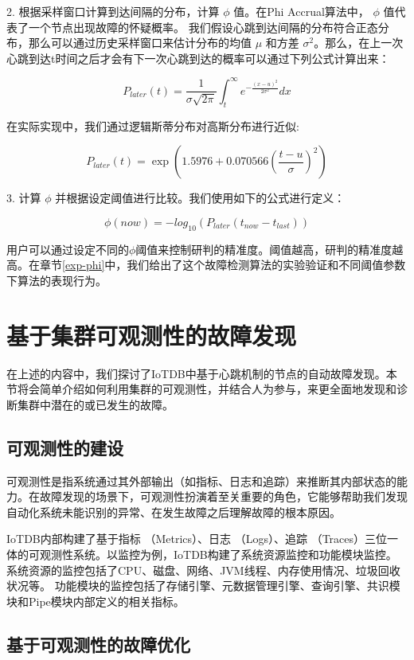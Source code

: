 2. 根据采样窗口计算到达间隔的分布，计算 $\phi$ 值。在Phi Accrual算法中， $\phi$ 值代表了一个节点出现故障的怀疑概率。
我们假设心跳到达间隔的分布符合正态分布，那么可以通过历史采样窗口来估计分布的均值 $\mu$ 和方差 $\sigma^2$。那么，在上一次心跳到达t时间之后才会有下一次心跳到达的概率可以通过下列公式计算出来：


$$ P_{later}(t) = \frac{1}{\sigma\sqrt{2\pi}} \int_{t}^{\infty} e^{-\frac{(x-u)^2}{2\sigma^2}} dx $$

在实际实现中，我们通过逻辑斯蒂分布对高斯分布进行近似\cite{bronvstejn2013handbook}:

$$ P_{later}(t) = \exp(1.5976 + 0.070566 (\frac{t-u}{\sigma})^2) $$


3. 计算 $\phi$ 并根据设定阈值进行比较。我们使用如下的公式进行定义：

$$ \phi(now) = -log_{10}(P_{later}(t_{now} - t_{last})) $$

用户可以通过设定不同的$\phi$阈值来控制研判的精准度。阈值越高，研判的精准度越高。在章节\ref{exp-phi}中，我们给出了这个故障检测算法的实验验证和不同阈值参数下算法的表现行为。


\section{基于集群可观测性的故障发现}

在上述的内容中，我们探讨了IoTDB中基于心跳机制的节点的自动故障发现。本节将会简单介绍如何利用集群的可观测性，并结合人为参与，来更全面地发现和诊断集群中潜在的或已发生的故障。

\subsection{可观测性的建设}

可观测性是指系统通过其外部输出（如指标、日志和追踪）来推断其内部状态的能力。在故障发现的场景下，可观测性扮演着至关重要的角色，它能够帮助我们发现自动化系统未能识别的异常、在发生故障之后理解故障的根本原因。

IoTDB内部构建了基于指标 （Metrics）、日志 （Logs）、追踪 （Traces）三位一体的可观测性系统。以监控为例，IoTDB构建了系统资源监控和功能模块监控。
系统资源的监控包括了CPU、磁盘、网络、JVM线程、内存使用情况、垃圾回收状况等。
功能模块的监控包括了存储引擎、元数据管理引擎、查询引擎、共识模块和Pipe模块内部定义的相关指标。

\subsection{基于可观测性的故障优化}

